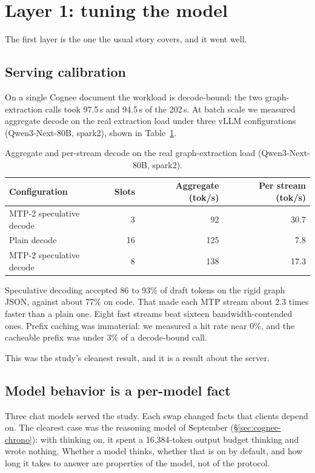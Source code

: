 \documentclass[11pt]{article}
\begin{document}
\section{Layer 1: tuning the model}
\label{sec:layer1}

The first layer is the one the usual story covers, and it went well.

\subsection{Serving calibration}

On a single Cognee document the workload is decode-bound: the two graph-extraction calls took
97.5\,s and 94.5\,s of the 202\,s. At batch scale we measured aggregate decode on the real
extraction load under three vLLM configurations (Qwen3-Next-80B, spark2), shown in
Table~\ref{tab:calibration}.

\begin{table}[t]
\centering
\caption{Aggregate and per-stream decode on the real graph-extraction load (Qwen3-Next-80B, spark2).}
\label{tab:calibration}
\begin{tabular}{lrrr}
\toprule
Configuration & Slots & Aggregate (tok/s) & Per stream (tok/s) \\
\midrule
MTP-2 speculative decode & 3 & 92 & 30.7 \\
Plain decode & 16 & 125 & 7.8 \\
MTP-2 speculative decode & 8 & 138 & 17.3 \\
\bottomrule
\end{tabular}
\end{table}

Speculative decoding accepted 86 to 93\% of draft tokens on the rigid graph JSON, against about 77\%
on code. That made each MTP stream about 2.3 times faster than a plain one. Eight fast streams beat
sixteen bandwidth-contended ones. Prefix caching was immaterial: we measured a hit rate near 0\%,
and the cacheable prefix was under 3\% of a decode-bound call.

This was the study's cleanest result, and it is a result about the server.

\subsection{Model behavior is a per-model fact}

Three chat models served the study. Each swap changed facts that clients depend on. The clearest case
was the reasoning model of September (\S\ref{sec:cognee-chrono}): with thinking on, it spent a
16,384-token output budget thinking and wrote nothing. Whether a model thinks, whether that is on by
default, and how long it takes to answer are properties of the model, not of the protocol.
\end{document}
